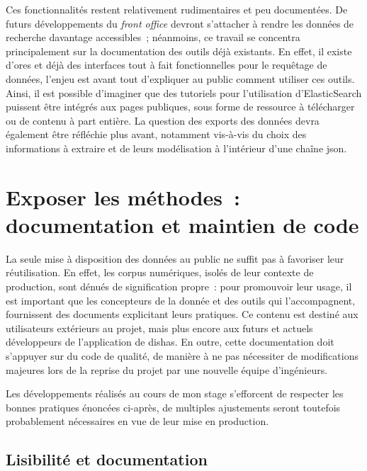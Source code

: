 \documentclass[a4paper,12pt,twoside]{book}
\newcommand{\eng}{\emph}
\newcommand{\fo}{\eng{front office}\xspace}
\newcommand{\dishas}{\gls{dishas}\xspace}
\newcommand{\json}{\gls{json}\xspace}
\begin{document}
Ces fonctionnalités restent relativement rudimentaires et peu documentées. De futurs développements du \fo devront s'attacher à rendre les données de recherche davantage accessibles~; néanmoins, ce travail se concentra principalement sur la documentation des outils déjà existants. En effet, il existe d'ores et déjà des interfaces tout à fait fonctionnelles pour le requêtage de données, l'enjeu est avant tout d'expliquer au public comment utiliser ces outils. Ainsi, il est possible d'imaginer que des tutoriels pour l'utilisation d'ElasticSearch puissent être intégrés aux pages publiques, sous forme de ressource à télécharger ou de contenu à part entière. La question des exports des données devra également être réfléchie plus avant, notamment vis-à-vis du choix des informations à extraire et de leurs modélisation à l'intérieur d'une chaîne \json.

	\section{Exposer les méthodes~: documentation et maintien de code}
La seule mise à disposition des données au public ne suffit pas à favoriser leur réutilisation. En effet, les corpus numériques, isolés de leur contexte de production, sont dénués de signification propre~: pour promouvoir leur usage, il est important que les concepteurs de la donnée et des outils qui l'accompagnent, fournissent des documents explicitant leurs pratiques. Ce contenu est destiné aux utilisateurs extérieurs au projet, mais plus encore aux futurs et actuels développeurs de l'application de \dishas. En outre, cette documentation doit s'appuyer sur du code de qualité, de manière à ne pas nécessiter de modifications majeures lors de la reprise du projet par une nouvelle équipe d'ingénieurs.

Les développements réalisés au cours de mon stage s'efforcent de respecter les bonnes pratiques énoncées ci-après, de multiples ajustements seront toutefois probablement nécessaires en vue de leur mise en production.

			\subsection{Lisibilité et documentation}
\end{document}

